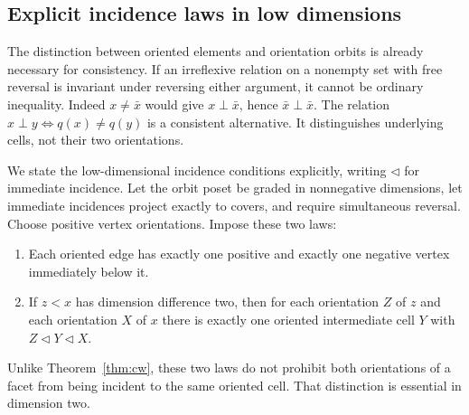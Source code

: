 \subsection{Explicit incidence laws in low dimensions}
The distinction between oriented elements and orientation orbits is
already necessary for consistency. If an irreflexive relation on a
nonempty set with free reversal is invariant under reversing either
argument, it cannot be ordinary inequality. Indeed
$x\ne\bar x$ would give $x\perp\bar x$, hence
$\bar x\perp\bar x$. The relation
$x\perp y\Longleftrightarrow q(x)\ne q(y)$ is a consistent
alternative. It distinguishes underlying cells, not their two
orientations.

We state the low-dimensional incidence conditions explicitly,
writing $\triangleleft$ for immediate incidence.
Let the orbit poset be graded in nonnegative dimensions, let immediate
incidences project exactly to covers, and require simultaneous
reversal. Choose positive vertex orientations. Impose these two laws:
\begin{enumerate}
\item Each oriented edge has exactly one positive and exactly one
negative vertex immediately below it.
\item If $z<x$ has dimension difference two, then for each orientation
$Z$ of $z$ and each orientation $X$ of $x$ there is exactly one
oriented intermediate cell $Y$ with
$Z\mathrel{\triangleleft}Y\mathrel{\triangleleft}X$.
\end{enumerate}
Unlike Theorem~\ref{thm:cw}, these two laws do not prohibit both
orientations of a facet from being incident to the same oriented cell.
That distinction is essential in dimension two.

